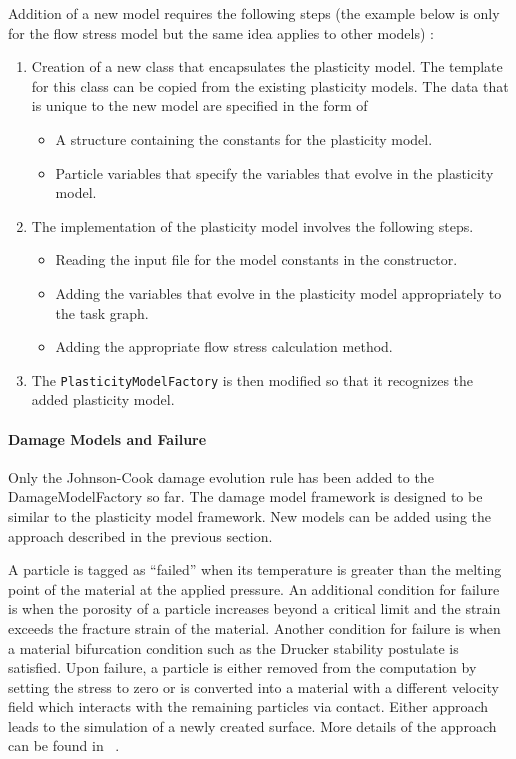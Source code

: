 Addition of a new model requires the following steps (the example below is only
for the flow stress model but the same idea applies to other models) :
\begin{enumerate}
    \item Creation of a new class that encapsulates the plasticity
    model.  The template for this class can be copied from the
    existing plasticity models.  The data that is unique to
    the new model are specified in the form of
    \begin{itemize}
      \item A structure containing the constants for the plasticity
            model.
      \item Particle variables that specify the variables that
            evolve in the plasticity model.
    \end{itemize}
    \item The implementation of the plasticity model involves the
    following steps.
    \begin{itemize}
      \item Reading the input file for the model constants in the
            constructor.
      \item Adding the variables that evolve in the plasticity model
            appropriately to the task graph.
      \item Adding the appropriate flow stress calculation method.
    \end{itemize}
    \item The \verb+PlasticityModelFactory+ is then modified so that
          it recognizes the added plasticity model.
\end{enumerate}

\paragraph{Damage Models and Failure}
Only the Johnson-Cook damage evolution rule has been added to the
DamageModelFactory so far.  The damage model framework is designed
to be similar to the plasticity model framework.  New models can
be added using the approach described in the previous section.

  A particle is tagged as ``failed'' when its temperature is greater than the
  melting point of the material at the applied pressure.  An additional
  condition for failure is when the porosity of a particle increases beyond a
  critical limit and the strain exceeds the fracture strain of the material.
  Another condition for failure is when a material bifurcation
  condition such as the Drucker stability postulate is satisfied.  Upon failure,
  a particle is either removed from the computation by setting the stress to
  zero or is converted into a material with a different velocity field
  which interacts with the remaining particles via contact.  Either approach
  leads to the simulation of a newly created surface.  More details of the
  approach can be found in ~\cite{Banerjee04a,Banerjee04c,Banerjee05}.

